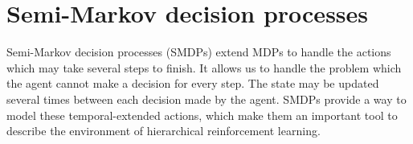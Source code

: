 


\section{Semi-Markov decision processes}
\label{se:SMDP}

Semi-Markov decision processes (SMDPs) \cite{Puterman94} extend MDPs to handle
the actions which may take several steps to finish. It allows us to handle the
problem which the agent cannot make a decision for every step. The state may
be updated several times between each decision made by the agent. SMDPs
provide a way to model these temporal-extended actions, which make them an
important tool to describe the environment of hierarchical reinforcement
learning.

